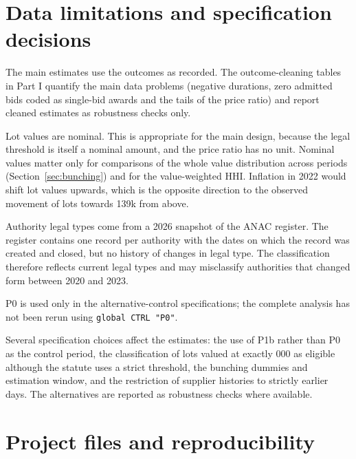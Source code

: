 \documentclass[11pt,a4paper]{article}
\newcommand{\code}[1]{\texttt{\small #1}}
\begin{document}
\section{Data limitations and specification decisions}
\label{sec:limits}

The main estimates use the outcomes as recorded. The outcome-cleaning tables in Part I quantify the main data problems (negative durations, zero admitted bids coded as single-bid awards and the tails of the price ratio) and report cleaned estimates as robustness checks only.

Lot values are nominal. This is appropriate for the main design, because the legal threshold is itself a nominal amount, and the price ratio has no unit. Nominal values matter only for comparisons of the whole value distribution across periods (Section~\ref{sec:bunching}) and for the value-weighted HHI. Inflation in 2022 would shift lot values upwards, which is the opposite direction to the observed movement of lots towards \texteuro139k from above.

Authority legal types come from a 2026 snapshot of the ANAC register. The register contains one record per authority with the dates on which the record was created and closed, but no history of changes in legal type. The classification therefore reflects current legal types and may misclassify authorities that changed form between 2020 and 2023.

P0 is used only in the alternative-control specifications; the complete analysis has not been rerun using \code{global CTRL "P0"}.

Several specification choices affect the estimates: the use of P1b rather than P0 as the control period, the classification of lots valued at exactly 000 as eligible although the statute uses a strict threshold, the bunching dummies and estimation window, and the restriction of supplier histories to strictly earlier days. The alternatives are reported as robustness checks where available.

\appendix
\section{Project files and reproducibility}
\end{document}
